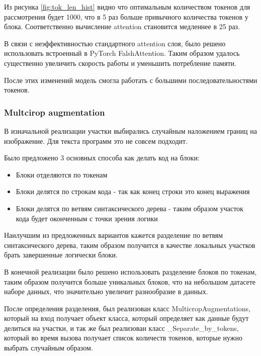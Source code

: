 \documentclass[../part_2.tex]{subfiles}
\begin{document}
    \par Из рисунка \ref{fig:tok_len_hist} видно что оптимальным количеством токенов для рассмотрения будет 1000, что в 5 раз больше привычного количества токенов у блока. Соответственно вычисление attention становится медленнее в 25 раз.
    \par В связи с неэффективностью стандартного attention слоя, было решено использовать встроенный в PyTorch FalshAttention\cite{dao2022flashattentionfastmemoryefficientexact}. Таким образом удалось существенно увеличить скорость работы и уменьшить потребление памяти.
    \par После этих изменений модель смогла работать с большими последовательностями токенов.

    \subsubsection{Multcirop augmentation}
    \par В изначальной реализации участки выбирались случайным наложением границ на изображение. Для текста программ это не совсем подходит.
    \par Было предложено 3 основных способа как делать код на блоки:
    \begin{itemize}
        \item Блоки отделяются по токенам
        \item Блоки делятся по строкам кода - так как конец строки это конец выражения
        \item Блоки делятся по ветвям синтаксического дерева - таким образом участок кода будет оконченным с точки зрения логики
    \end{itemize}
    \par Наилучшим из предложенных вариантов кажется разделение по ветвям синтаксического дерева, таким образом получится в качестве локальных участков брать завершенные логически блоки.
    \par В конечной реализации было решено использовать разделение блоков по токенам, таким образом получится больше уникальных блоков, что на небольшом датасете наборе данных, что значительно увеличит разнообразие в данных.
    \par После определения разделения, был реализован класс MulticropAugmentations, который на вход получает объект класса, который определяет как данные будут делиться на участки, и так же был реализован класс \_Separate\_by\_tokens, который во время вызова получает список количеств токенов, которые нужно выбрать случайным образом.
\end{document}
